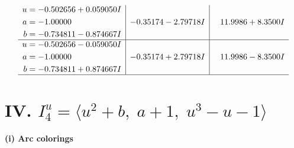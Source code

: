 \documentclass[1p]{elsarticle_modified}
\theoremstyle{definition}
\begin{document}
$$\begin{array}{c|c|c}
\begin{aligned}
u &= -0.502656 + 0.059050 I \\
a &= -1.00000\phantom{ +0.000000I} \\
b &= -0.734811 - 0.874667 I\end{aligned}
 & -0.35174 - 2.79718 I & \phantom{-}11.9986 + 8.3500 I \\ \hline\begin{aligned}
u &= -0.502656 - 0.059050 I \\
a &= -1.00000\phantom{ +0.000000I} \\
b &= -0.734811 + 0.874667 I\end{aligned}
 & -0.35174 + 2.79718 I & \phantom{-}11.9986 - 8.3500 I\\
 \hline 
 \end{array}$$\newpage\newpage\renewcommand{\arraystretch}{1}
\centering \section*{IV. $I^u_{4}= \langle u^2+b,\;a+1,\;u^3- u-1 \rangle$}
\flushleft \textbf{(i) Arc colorings}\\
\end{document}
